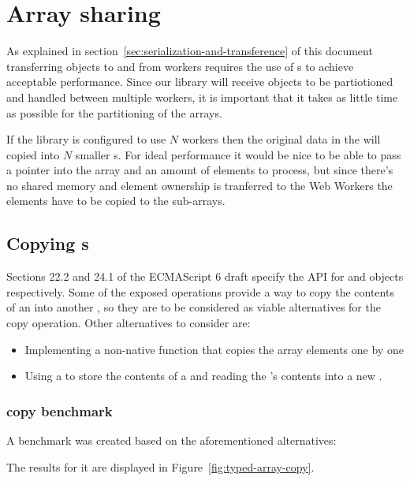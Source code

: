 \section{Array sharing}

As explained in section~\ref{sec:serialization-and-transference} of this document transferring \ttarray{} objects to and from workers requires the use of s to achieve acceptable performance. Since our library will receive \ttarray{} objects to be partiotioned and handled between multiple workers, it is important that it takes as little time as possible for the partitioning of the arrays.

If the library is configured to use \(N\) workers then the original data in the \ttarray{} will copied into \(N\) smaller \ttarray{}s. For ideal performance it would be nice to be able to pass a pointer into the array and an amount of elements to process, but since there's no shared memory and element ownership is tranferred to the Web Workers the elements have to be copied to the sub-arrays.

\subsection{Copying \ttarray{}s}
Sections 22.2 and 24.1 of the ECMAScript 6 draft \cite{es6} specify the API for \ttarray{} and \tabuffer{} objects respectively. Some of the exposed operations provide a way to copy the contents of an \tabuffer{} into another \tabuffer{}, so they are to be considered as viable alternatives for the copy operation. Other alternatives to consider are:
\begin{itemize}
  \item Implementing a non-native function that copies the array elements one by one
  \item Using a  to store the contents of a \ttarray{} and reading the 's contents into a new \ttarray{}.
\end{itemize}

\subsubsection{\ttarray{} copy benchmark}
A benchmark was created based on the aforementioned alternatives:

The results for it are displayed in Figure~\ref{fig:typed-array-copy}.

